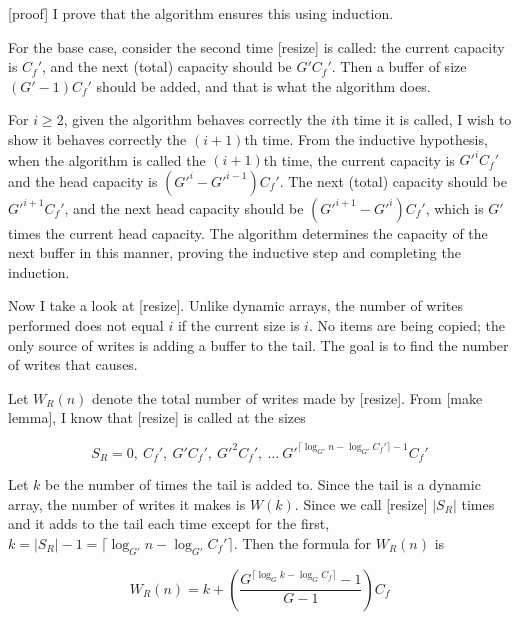 \documentclass{article}
\newcommand{\nwritesfn}{W}
\newcommand{\nwritesresizefn}{W_R}
\newcommand{\varnitems}{n}
\newcommand{\initcapacity}{C_f}
\newcommand{\growthfactor}{G}
\newcommand{\initcapacitynew}{\initcapacity'}
\newcommand{\growthfactornew}{\growthfactor'}
\begin{document}
	[proof]
	I prove that the algorithm ensures this using induction.
	
	For the base case, consider the second time [resize] is called: the current capacity is $\initcapacitynew$, and the next (total) capacity should be $\growthfactornew\initcapacitynew$. Then a buffer of size $(\growthfactornew - 1)\initcapacitynew$ should be added, and that is what the algorithm does.
	
	For $i \geq 2$, given the algorithm behaves correctly the $i$th time it is called, I wish to show it behaves correctly the $(i + 1)$th time. From the inductive hypothesis, when the algorithm is called the $(i + 1)$th time, the current capacity is $\growthfactornew^i\initcapacitynew$ and the head capacity is $(\growthfactornew^i - \growthfactornew^{i - 1})\initcapacitynew$. The next (total) capacity should be $\growthfactornew^{i + 1}\initcapacitynew$, and the next head capacity should be $(\growthfactornew^{i + 1} - \growthfactornew^i)\initcapacitynew$, which is $\growthfactornew$ times the current head capacity. The algorithm determines the capacity of the next buffer in this manner, proving the inductive step and completing the induction.
	
	Now I take a look at [resize]. Unlike dynamic arrays, the number of writes performed does not equal $i$ if the current size is $i$. No items are being copied; the only source of writes is adding a buffer to the tail. The goal is to find the number of writes that causes.
	
	Let $\nwritesresizefn(n)$ denote the total number of writes made by [resize]. From [make lemma], I know that [resize] is called at the sizes
	
	$$
	S_R = 0,\ \initcapacitynew,\ \growthfactornew\initcapacitynew,\ \growthfactornew^2\initcapacitynew,\ \ldots\ \growthfactornew^{\lceil \log_{\growthfactornew} \varnitems - \log_{\growthfactornew} \initcapacitynew \rceil - 1}\initcapacitynew
	$$
	
	Let $k$ be the number of times the tail is added to. Since the tail is a dynamic array, the number of writes it makes is $\nwritesfn(k)$. Since we call [resize] $|S_R|$ times and it adds to the tail each time except for the first, $k = |S_R| - 1 = \lceil \log_{\growthfactornew} \varnitems - \log_{\growthfactornew} \initcapacitynew \rceil$. Then the formula for $\nwritesresizefn(n)$ is
	
	$$
	\nwritesresizefn(n) = k + \left( \frac{\growthfactor^{\lceil \log_{\growthfactor} k - \log_{\growthfactor} \initcapacity \rceil} - 1}{\growthfactor - 1} \right) \initcapacity
	$$
	
\end{document}
